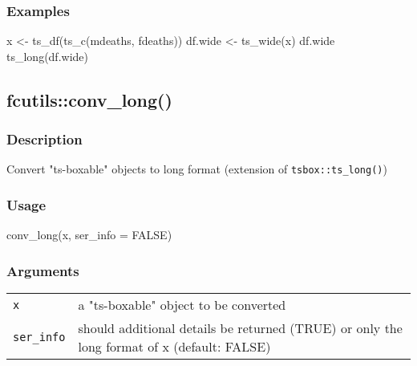 \documentclass[
  letterpaper,
  DIV=11,
  numbers=noendperiod]{scrreport}
\newenvironment{Shaded}{\begin{snugshade}}{\end{snugshade}}
\newcommand{\AttributeTok}[1]{\textcolor[rgb]{0.40,0.45,0.13}{#1}}
\newcommand{\ConstantTok}[1]{\textcolor[rgb]{0.56,0.35,0.01}{#1}}
\newcommand{\FunctionTok}[1]{\textcolor[rgb]{0.28,0.35,0.67}{#1}}
\newcommand{\NormalTok}[1]{\textcolor[rgb]{0.00,0.23,0.31}{#1}}
\newcommand{\OtherTok}[1]{\textcolor[rgb]{0.00,0.23,0.31}{#1}}
\begin{document}
\subsubsection{Examples}\label{examples-51}

\begin{Shaded}
\begin{Highlighting}[]
\NormalTok{x }\OtherTok{\textless{}{-}} \FunctionTok{ts\_df}\NormalTok{(}\FunctionTok{ts\_c}\NormalTok{(mdeaths, fdeaths))}
\NormalTok{df.wide }\OtherTok{\textless{}{-}} \FunctionTok{ts\_wide}\NormalTok{(x)}
\NormalTok{df.wide}
\FunctionTok{ts\_long}\NormalTok{(df.wide)}
\end{Highlighting}
\end{Shaded}

\subsection{fcutils::conv\_long()}\label{fcutilsconv_long}

\subsubsection{Description}\label{description-52}

Convert "ts-boxable" objects to long format (extension of
\texttt{tsbox::ts\_long()})

\subsubsection{Usage}\label{usage-52}

\begin{Shaded}
\begin{Highlighting}[]
\FunctionTok{conv\_long}\NormalTok{(x, }\AttributeTok{ser\_info =} \ConstantTok{FALSE}\NormalTok{)}
\end{Highlighting}
\end{Shaded}

\subsubsection{Arguments}\label{arguments-52}

\begin{longtable}[]{@{}ll@{}}
\toprule\noalign{}
\endhead
\bottomrule\noalign{}
\endlastfoot
\texttt{x} & a "ts-boxable" object to be converted \\
\texttt{ser\_info} & should additional details be returned (TRUE) or
only the long format of x (default: FALSE) \\
\end{longtable}
\end{document}
